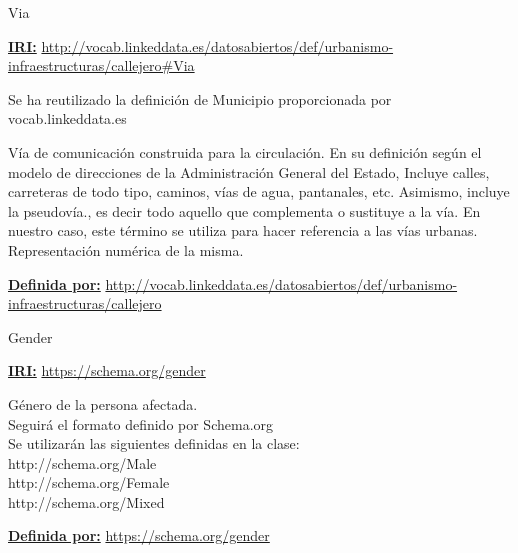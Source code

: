\begin{mybox}{Via}
\begin{flushleft}
\underline{\textbf{IRI:}}
\url{http://vocab.linkeddata.es/datosabiertos/def/urbanismo-infraestructuras/callejero#Via}
\newline

Se ha reutilizado la definición de Municipio proporcionada por vocab.linkeddata.es \cite{datoabiertos_idVia}

Vía de comunicación construida para la circulación. En su definición según el modelo de direcciones de la Administración General del Estado, Incluye calles, carreteras de todo tipo, caminos, vías de agua, pantanales, etc. Asimismo, incluye la pseudovía., es decir todo aquello que complementa o sustituye a la vía. En nuestro caso, este término se utiliza para hacer referencia a las vías urbanas.
Representación numérica de la misma.
\newline

\underline{\textbf{Definida por:}}\newline
\url{http://vocab.linkeddata.es/datosabiertos/def/urbanismo-infraestructuras/callejero}
\newline




\end{flushleft}
\end{mybox}





\begin{mybox}{Gender}
\begin{flushleft}
\underline{\textbf{IRI:}}
\url{https://schema.org/gender}
\newline

Género de la persona afectada.
\\Seguirá el formato definido por Schema.org
\\Se utilizarán las siguientes definidas en la clase:
\\http://schema.org/Male
\\http://schema.org/Female
\\http://schema.org/Mixed
\newline

\underline{\textbf{Definida por:}}\newline
\url{https://schema.org/gender}
\newline




\end{flushleft}
\end{mybox}



